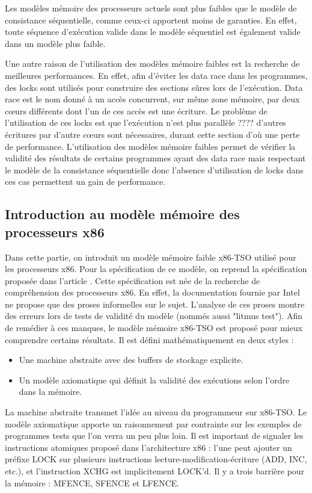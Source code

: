 \documentclass[12pt,a4paper]{article}
\begin{document}
Les modèles mémoire des processeurs actuels sont plus faibles que le modèle de consistance séquentielle, comme ceux-ci apportent moins de garanties. En effet, toute séquence d'exécution valide dans le modèle séquentiel est également valide dans un modèle plus faible.

Une autre raison de l'utilisation des modèles mémoire faibles est la recherche de meilleures performances. En effet, afin d'éviter les data race dans les programmes, des locks sont utilisés pour construire des sections sûres lors de l'exécution. Data race est le nom donné à un accès concurrent, sur même zone mémoire, par deux cœurs différents dont l'un de ces accès est une écriture. Le problème de l'utilisation de ces locks est que l'exécution n'est plus parallèle ???? d'autres écritures par d'autre cœurs sont nécessaires, durant cette section d'où une perte de performance. L'utilisation des modèles mémoire faibles permet de vérifier la validité des résultats de certains programmes ayant des data race mais respectant le modèle de la consistance séquentielle donc l'absence d'utilisation de locks dans ces cas permettent un gain de performance.  

\subsection{Introduction au modèle mémoire des processeurs x86}
 
Dans cette partie, on introduit un modèle mémoire faible x86-TSO utilisé pour les processeurs x86. Pour la spécification de ce modèle, on reprend la spécification proposée dans l'article \cite{Sewell:2010:XRU:1785414.1785443}. Cette spécification est née de la recherche de compréhension des processeurs x86. En effet, la documentation fournie par Intel ne propose que des proses informelles sur le sujet. L'analyse de ces proses montre des erreurs lors de tests de validité du modèle (nommés aussi "litmus test"). Afin de remédier à ces manques, le modèle mémoire x86-TSO est proposé pour mieux comprendre certains résultats. Il est défini mathématiquement en deux styles :
\begin{itemize}
	\item Une machine abstraite avec des buffers de stockage explicite.
	\item Un modèle axiomatique qui définit la validité des exécutions selon l'ordre dans la mémoire. 
\end{itemize}
La machine abstraite transmet l'idée au niveau du programmeur sur x86-TSO. Le modèle axiomatique apporte un raisonnement par contrainte sur les exemples de programmes tests que l'on verra un peu plus loin. Il est important de signaler les instructions atomiques proposé dans l'architecture x86 : l'une peut ajouter un préfixe LOCK sur plusieurs instructions lecture-modification-écriture (ADD, INC, etc.), et l'instruction XCHG est implicitement LOCK'd. Il y a trois barrière pour la mémoire : MFENCE, SFENCE et LFENCE.
\end{document}

